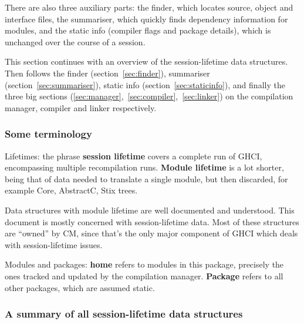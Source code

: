 \documentclass[11pt]{article}
\begin{document}
There are also three auxiliary parts: the finder, which locates
source, object and interface files, the summariser, which quickly
finds dependency information for modules, and the static info
(compiler flags and package details), which is unchanged over the
course of a session.

This section continues with an overview of the session-lifetime data
structures.  Then follows the finder (section~\ref{sec:finder}),
summariser (section~\ref{sec:summariser}), 
static info (section~\ref{sec:staticinfo}),
and finally the three big sections
(\ref{sec:manager},~\ref{sec:compiler},~\ref{sec:linker})
on the compilation manager, compiler and linker respectively.

\subsubsection*{Some terminology}

Lifetimes: the phrase {\bf session lifetime} covers a complete run of
GHCI, encompassing multiple recompilation runs.  {\bf Module lifetime}
is a lot shorter, being that of data needed to translate a single
module, but then discarded, for example Core, AbstractC, Stix trees.

Data structures with module lifetime are well documented and understood.
This document is mostly concerned with session-lifetime data.
Most of these structures are ``owned'' by CM, since that's
the only major component of GHCI which deals with session-lifetime
issues. 

Modules and packages: {\bf home} refers to modules in this package,
precisely the ones tracked and updated by the compilation manager.
{\bf Package} refers to all other packages, which are assumed static.

\subsubsection*{A summary of all session-lifetime data structures}
\end{document}
